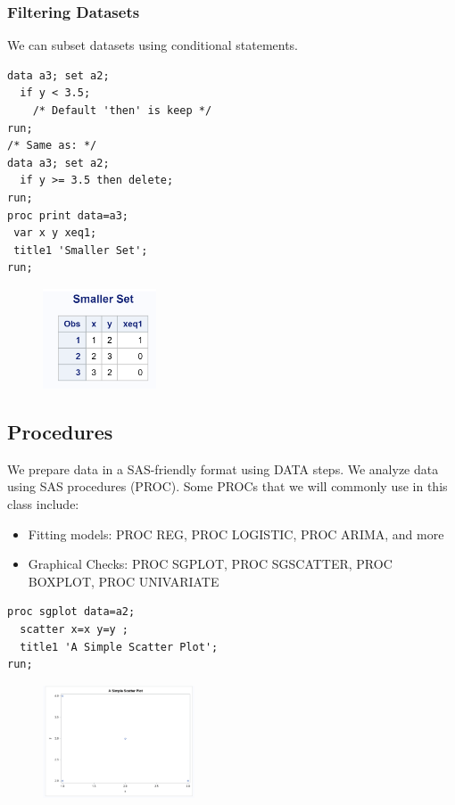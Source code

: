 \documentclass[12pt]{../notes}
\begin{document}
\subsubsection*{Filtering Datasets}
We can subset datasets using conditional statements.

\begin{verbatim}
data a3; set a2;
  if y < 3.5;
    /* Default 'then' is keep */
run;
/* Same as: */
data a3; set a2;
  if y >= 3.5 then delete;
run;
proc print data=a3;
 var x y xeq1;
 title1 'Smaller Set';
run;
\end{verbatim}

\begin{figure}[H]
\centering
\includegraphics[width = 0.3\textwidth]{../figures/module1/sas3.png}
\end{figure}

\subsection*{Procedures}
We prepare data in a SAS-friendly format using DATA steps. We analyze data using SAS procedures (PROC). Some PROCs that we will commonly use in this class include:
\begin{itemize}
\item Fitting models: PROC REG, PROC LOGISTIC, PROC ARIMA, and more
\item Graphical Checks: PROC SGPLOT, PROC SGSCATTER, PROC BOXPLOT, PROC UNIVARIATE
\end{itemize} 

\begin{verbatim}
proc sgplot data=a2;
  scatter x=x y=y ;
  title1 'A Simple Scatter Plot';
run;
\end{verbatim}


\begin{figure}[H]
\centering
\includegraphics[width = 0.4\textwidth]{../figures/module1/sas4.png}
\end{figure}
\end{document}
